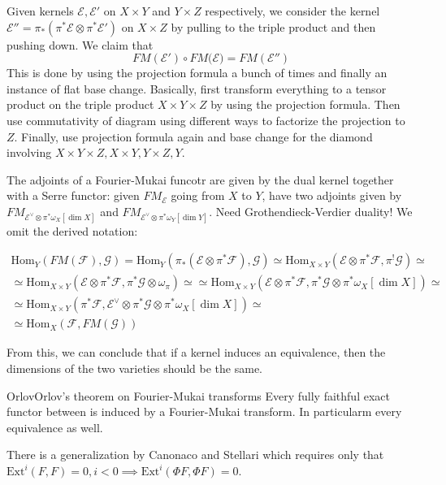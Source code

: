 Given kernels $\mathcal{E}, \mathcal{E}'$ on $X\times Y$ and $Y\times Z$ respectively, we consider the kernel $\mathcal{E}''=\pi_{*}(\pi^*\mathcal{E}\otimes \pi^*\mathcal{E}')$ on $X\times Z$ by pulling to the triple product and then pushing down. We claim that $$FM(\mathcal{E'})\circ FM(\mathcal{E)}=FM(\mathcal{E}'')$$This is done by using the projection formula a bunch of times and finally an instance of flat base change. Basically, first transform everything to a tensor product on the triple product $X\times Y \times Z$ by using the projection formula. Then use commutativity of diagram using different ways to factorize the projection to $Z$. Finally, use projection formula again and base change for the diamond involving $X\times Y \times Z, X\times Y, Y\times Z, Y$. 

The adjoints of a Fourier-Mukai funcotr are given by the dual kernel together with a Serre functor: given $FM_\mathcal{E}$ going from $X$ to $Y$, have two adjoints given by $FM_{\mathcal{E}^\lor \otimes \pi^* \omega_{X}[\dim X]}$ and $FM_{\mathcal{E}^\lor \otimes \pi^* \omega_{Y}[\dim Y]}$. Need Grothendieck-Verdier duality! We omit the derived notation:

$$\begin{gathered}
\mathrm{Hom}_{Y}(FM(\mathcal{F}), \mathcal{G})=\mathrm{Hom}_{Y} (\pi_{*} (\mathcal{E} \otimes \pi^* \mathcal{F}), \mathcal{G})\simeq \mathrm{Hom}_{X\times Y}(\mathcal{E\otimes \pi^*\mathcal{F}}, \pi^! \mathcal{G})\simeq \\ \simeq \mathrm{Hom}_{X\times Y}(\mathcal{E\otimes \pi^*\mathcal{F}}, \pi^*\mathcal{G}\otimes \omega_{\pi})\simeq \simeq \mathrm{Hom}_{X\times Y}(\mathcal{E\otimes \pi^*}\mathcal{F}, \pi^*\mathcal{G} \otimes \pi^* \omega_{X}[\dim X])\simeq \\ \simeq \mathrm{Hom}_{X\times Y}(\pi^*\mathcal{F, \mathcal{E}^\lor}\otimes \pi^*\mathcal{G} \otimes \pi^* \omega_{X}[\dim X])\simeq \\ \simeq \mathrm{Hom}_{X}(\mathcal{F}, FM(\mathcal{G}))
\end{gathered}$$

From this, we can conclude that if a kernel induces an equivalence, then the dimensions of the two varieties should be the same.

\begin{theorem}{Orlov}{Orlov's theorem on Fourier-Mukai transforms}
Every fully faithful exact functor between is induced by a Fourier-Mukai transform. In particularm every equivalence as well.
\end{theorem}
There is a generalization by Canonaco and Stellari which requires only that $\mathrm{Ext}^i(F,F)=0, i < 0 \implies \mathrm{Ext}^i(\Phi F,\Phi F)=0$. 

